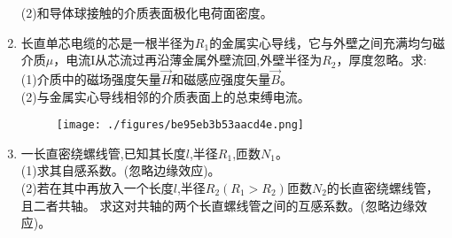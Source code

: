 \begin{enumerate}
(2)和导体球接触的介质表面极化电荷面密度。
\item 长直单芯电缆的芯是一根半径为$ R_1$的金属实心导线，它与外壁之间充满均匀磁介质$\mu$，电流I从芯流过再沿薄金属外壁流回,外壁半径为$R_2$，厚度忽略。求:\\
(1)介质中的磁场强度矢量$\vec H$和磁感应强度矢量$\vec B$。\\
(2)与金属实心导线相邻的介质表面上的总束缚电流。
\begin{figure}[ht]
\centering
\texttt{[image: ./figures/be95eb3b53aacd4e.png]}
\caption{} \label{fig_SSD11_3}
\end{figure}
\item 一长直密绕螺线管,已知其长度$l$,半径$R_1$,匝数$N_1$。\\
(1)求其自感系数。(忽略边缘效应)。\\
(2)若在其中再放入一个长度$l$,半径$R_2(R_1>R_2)$匝数$N_2$的长直密绕螺线管，且二者共轴。
求这对共轴的两个长直螺线管之间的互感系数。(忽略边缘效应)。
\end{enumerate}
